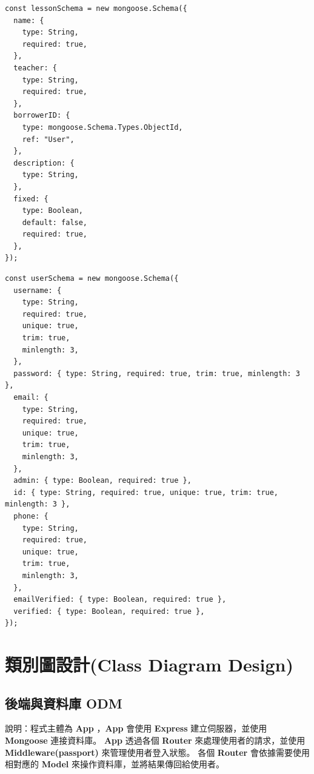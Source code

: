 \documentclass{article}
\begin{document}
\pagebreak

\begin{center}
	\begin{verbatim}
const lessonSchema = new mongoose.Schema({
  name: {
    type: String,
    required: true,
  },
  teacher: {
    type: String,
    required: true,
  },
  borrowerID: {
    type: mongoose.Schema.Types.ObjectId,
    ref: "User",
  },
  description: {
    type: String,
  },
  fixed: {
    type: Boolean,
    default: false,
    required: true,
  },
});
\end{verbatim}
\end{center}

\pagebreak

\begin{center}
	\begin{verbatim}
const userSchema = new mongoose.Schema({
  username: {
    type: String,
    required: true,
    unique: true,
    trim: true,
    minlength: 3,
  },
  password: { type: String, required: true, trim: true, minlength: 3 },
  email: {
    type: String,
    required: true,
    unique: true,
    trim: true,
    minlength: 3,
  },
  admin: { type: Boolean, required: true },
  id: { type: String, required: true, unique: true, trim: true, minlength: 3 },
  phone: {
    type: String,
    required: true,
    unique: true,
    trim: true,
    minlength: 3,
  },
  emailVerified: { type: Boolean, required: true },
  verified: { type: Boolean, required: true },
});
\end{verbatim}
\end{center}

\newpage

\section[類別圖設計(CLASS DIAGRAM DESIGN)]{類別圖設計(Class Diagram Design)}

\subsection{後端與資料庫 ODM}



\bigskip

說明：程式主體為 \textbf{App} ，\textbf{App} 會使用 \textbf{Express} 建立伺服器，並使用 \textbf{Mongoose} 連接資料庫。
\textbf{App} 透過各個 \textbf{Router} 來處理使用者的請求，並使用 \textbf{Middleware(passport)} 來管理使用者登入狀態。
各個 \textbf{Router} 會依據需要使用相對應的 \textbf{Model} 來操作資料庫，並將結果傳回給使用者。
\end{document}
